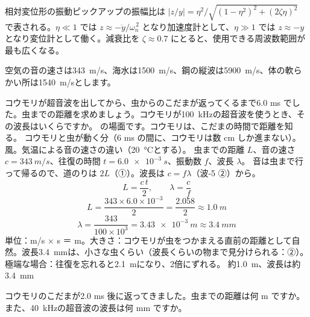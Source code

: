 \begin{senmonsho}[振動計測の本の書き方]
\begin{bkhonbun}
相対変位形の振動ピックアップの振幅比は $|z/y|=\eta^2/\sqrt{(1-\eta^2)^2+(2\zeta\eta)^2}$ で表される。$\eta\ll1$ では $z\approx-\ddot y/\omega_n^{\,2}$ となり加速度計として、$\eta\gg1$ では $z\approx-y$ となり変位計として働く。減衰比を $\zeta\approx0.7$ にとると、使用できる周波数範囲が最も広くなる。
\end{bkhonbun}
\end{senmonsho}


\noindent 空気の音の速さは\qty{343}{m/s}、海水は\qty{1500}{m/s}、鋼の縦波は\qty{5900}{m/s}、体の軟らかい所は\qty{1540}{m/s}とします。

\begin{phreidai}[コウモリと虫の距離]
\label{ph:波-10:ex1}コウモリが超音波を出してから、虫からのこだまが返ってくるまで6.0 ms でした。虫までの距離を求めましょう。コウモリが\qty{100}{kHz}の超音波を使うとき、その波長はいくらですか。
\phbamen
\bkhatenaref の場面です。コウモリは、こだまの時間で距離を知る。
\phmushi
コウモリと虫が動く分（6 ms の間に、コウモリは数 cm しか進まない）。風。気温による音の速さの違い（\qty{20}{\celsius}とする）。
\phzu
虫までの距離 $L$、音の速さ $c=\qty{343}{m/s}$、往復の時間 $t=\qty{6.0e-3}{s}$、振動数 $f$、波長 $\lambda$。
\phriyu
音は虫まで行って帰るので、道のりは $2L$（①）。波長は $c=f\lambda$（波-5 ②）から。
\phtateru
\[ L=\frac{c\,t}{2},\qquad \lambda=\frac{c}{f} \]
\phtoku
\[ L=\frac{343\times6.0\times10^{-3}}{2}=\frac{2.058}{2}\approx\qty{1.0}{m} \]
\[ \lambda=\frac{343}{100\times10^3}=\qty{3.43e-3}{m}\approx\qty{3.4}{mm} \]
\phtashikame
単位：m/s × s ＝ m。大きさ：コウモリが虫をつかまえる直前の距離として自然。波長\qty{3.4}{mm}は、小さな虫くらい（波長くらいの物まで見分けられる：②）。極端な場合：往復を忘れると\qty{2.1}{m}になり、2倍にずれる。
\kotae 約\qty{1.0}{m}、波長は約\qty{3.4}{mm}
\end{phreidai}
\begin{jibun}
コウモリのこだまが2.0 ms 後に返ってきました。虫までの距離は何 m ですか。また、\qty{40}{kHz}の超音波の波長は何 mm ですか。
\end{jibun}


